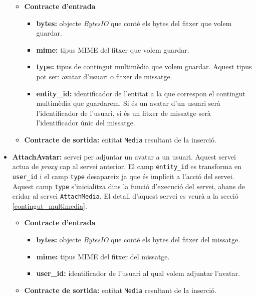 \begin{itemize}
				\begin{itemize}
					\item \textbf{Contracte d'entrada}
						\begin{itemize}
							\item \textbf{bytes:} objecte \emph{BytesIO} que conté els bytes del fitxer que volem guardar.
							\item \textbf{mime:} tipus \ac{MIME} del fitxer que volem guardar.
							\item \textbf{type:} tipus de contingut multimèdia que volem guardar. Aquest tipus pot ser: avatar d'usuari o fitxer de missatge.
							\item \textbf{entity\_id:} identificador de l'entitat a la que correspon el contingut multimèdia que guardarem. Si és un avatar d'un usuari serà l'identificador de l'usuari, si és un fitxer de missatge serà l'identificador únic del missatge.
						\end{itemize}
					\item \textbf{Contracte de sortida:} entitat \texttt{Media} resultant de la inserció.
				\end{itemize}
				
			\item \textbf{AttachAvatar:} servei per adjuntar un avatar a un usuari. Aquest servei actua de \emph{proxy} cap al servei anterior. El camp \texttt{entity\_id} es transforma en \texttt{user\_id} i el camp \texttt{type} desapareix ja que és implícit a l'acció del servei. Aquest camp \texttt{type} s'inicialitza dins la funció d'execució del servei, abans de cridar al servei \texttt{AttachMedia}.  El detall d'aquest servei es veurà a la secció \ref{contingut_multimedia}.
			
			\begin{itemize}
					\item \textbf{Contracte d'entrada}
						\begin{itemize}
							\item \textbf{bytes:} objecte \emph{BytesIO} que conté els bytes del fitxer del missatge.
							\item \textbf{mime:} tipus \ac{MIME} del fitxer del missatge.
							\item \textbf{user\_id:} identificador de l'usuari al qual volem adjuntar l'avatar.
						\end{itemize}
					\item \textbf{Contracte de sortida:} entitat \texttt{Media} resultant de la inserció.
				\end{itemize}
				

\end{itemize}
